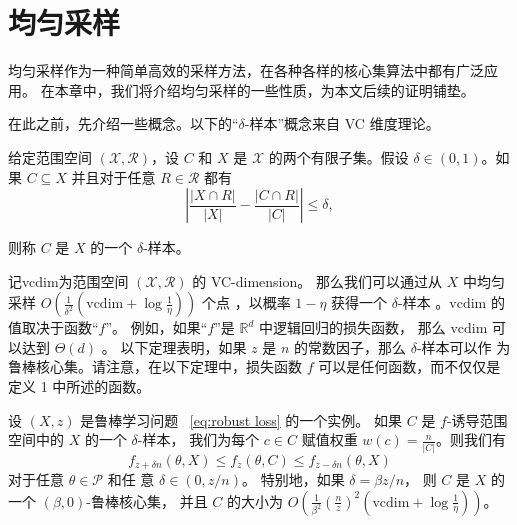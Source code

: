 \chapter{均匀采样}

均匀采样作为一种简单高效的采样方法，在各种各样的核心集算法中都有广泛应用。
在本章中，我们将介绍均匀采样的一些性质，为本文后续的证明铺垫。

在此之前，先介绍一些概念。以下的“$\delta$-样本”概念来自 VC 维度理论\cite{DBLP:journals/jcss/LiLS01}。

\begin{definition}
    给定范围空间 $(\mathcal{X}, \mathcal{R})$，设 $C$ 和 $X$ 是 $\mathcal{X}$ 的两个有限子集。假设 $\delta \in (0, 1)$。如果 $C \subseteq X$ 并且对于任意 $R \in \mathcal{R}$ 都有
    \begin{equation}
    \left| \frac{|X \cap R|}{|X|} - \frac{|C \cap R|}{|C|} \right| \leq \delta,
    \end{equation}

    则称 $C$ 是 $X$ 的一个 $\delta$-样本。
\end{definition}


记vcdim为范围空间 $(\mathcal{X}, \mathcal{R})$ 的 VC-dimension。
那么我们可以通过从 $X$ 中均匀采样 $O\left(\frac{1}{\delta^2} \left(\text{vcdim} + \log \frac{1}{\eta}\right)\right)$ 个点
，以概率 $1 - \eta$ 获得一个 $\delta$-样本 \cite{DBLP:journals/jcss/LiLS01}。$\text{vcdim}$ 的值取决于函数“$f$”。
例如，如果“$f$”是 $\mathbb{R}^d$ 中逻辑回归的损失函数，
那么 $\text{vcdim}$ 可以达到 $\Theta(d)$ \cite{DBLP:conf/gi/MunteanuSSW19}。
以下定理表明，如果 $z$ 是 $n$ 的常数因子，那么 $\delta$-样本可以作
为鲁棒核心集。请注意，在以下定理中，损失函数 $f$ 可以是任何函数，而不仅仅是定义 1 中所述的函数。

\begin{theorem}
    设 $(X, z)$ 是鲁棒学习问题 ~\eqref{eq:robust loss} 的一个实例。
    如果 $C$ 是 $f$-诱导范围空间中的 $X$ 的一个 $\delta$-样本，
    我们为每个 $c \in C$ 赋值权重 $w(c) = \frac{n}{|C|}$。则我们有
    \begin{equation*}
    f_{z+\delta n}(\theta, X) \leq f_z(\theta, C) \leq f_{z-\delta n}(\theta, X)
    \end{equation*}
    对于任意 $\theta \in \mathcal{P}$ 和任
    意 $\delta \in (0, z/n)$。
    特别地，如果 $\delta = \beta z / n$，
    则 $C$ 是 $X$ 的一个 $(\beta, 0)$-鲁棒核心集，
    并且 $C$ 的大小为 $O\left(\frac{1}{\beta^2}\left(\frac{n}{z}\right)^2\left(\text{vcdim} + \log \frac{1}{\eta}\right)\right)$。
\end{theorem}

